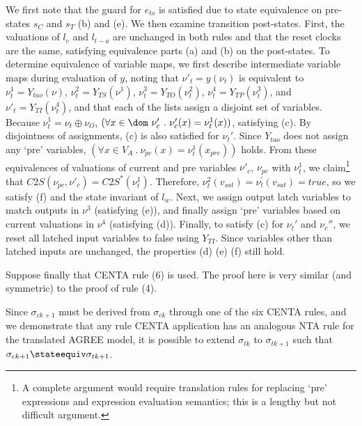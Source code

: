 We first note that the guard for $e_{to}$ is satisfied due to state equivalence on pre-states $s_{C}$ and $s_{T}$ (b) and (e).  We then examine transition post-states.  First, the valuations of $l_{c}$ and $l_{t-a}$ are unchanged in both rules and that the reset clocks are the same, satisfying equivalence parts (a) and (b) on the post-states.  To determine equivalence of variable maps, we first describe intermediate variable maps during evaluation of $y$, noting that $\nu'_{t} = y(\nu_{t})$ is equivalent to $\nu^{1}_{t} = Y_{tao}(\nu)$, $\nu^{2}_{t} = Y_{TS}(\nu^{1})$, $\nu^{3}_{t} = Y_{TO}(\nu^{2}_{t})$, $\nu^{4}_{t} = Y_{TP}(\nu^{3}_t)$, and $\nu'_{t} = Y_{TI}(\nu^{4}_t)$, and that each of the lists assign a disjoint set of variables.  Because $\nu_{t}^{1} = \nu_{t} \oplus \nu_{O}$, $(\forall x \in \dom~\nu'_{c}~.~\nu'_{c}(x) = \nu^{1}_{t}(x))$, satisfying (c).  By disjointness of assignments, (c) is also satisfied for $\nu_{t}'$.  Since $Y_{tao}$ does not assign any `pre' variables,  $(\forall x \in V_{A}~.~\nu_{pc}(x) = \nu^{1}_{t}(x_{pre}))$ holds.  From these equivalences of valuations of current and pre variables $\nu'_{c}$, $\nu_{pc}$ with $\nu^{1}_{t}$, we claim\footnote{A complete argument would require translation rules for replacing `pre' expressions and expression evaluation semantics; this is a lengthy but not difficult argument.} that $C2S(\nu_{pc},\nu'_{c}) = C2S^{*}(\nu^{1}_{t})$.  Therefore, $\nu^{2}_{t}(v_{sat}) = \nu^{'}_{t}(v_{sat}) = true$, so we satisfy (f) and the state invariant of $l_{w}$.  Next, we assign
output latch variables to match outputs in $\nu^{3}$ (satisfying (e)), and finally assign `pre' variables based on current valuations in $\nu^{4}$ (satisfying (d)). Finally, to satisfy (c) for $\nu_{t}'$ and $\nu_{c}''$, we reset all latched input variables to false using $Y_{TI}$.  Since variables other than latched inputs are unchanged, the properties (d) (e) (f) still hold.


Suppose finally that CENTA rule (6) is used.  The proof here is very similar (and symmetric) to the proof of rule (4).

Since $\sigma_{ck+1}$ must be derived from $\sigma_{ck}$ through one of the six CENTA rules, and we demonstrate that any rule CENTA application has an analogous NTA rule for the translated AGREE model, it is possible to extend $\sigma_{tk}$ to $\sigma_{tk+1}$ such that $\sigma_{ck+1} \stateequiv \sigma_{tk+1}$. %

